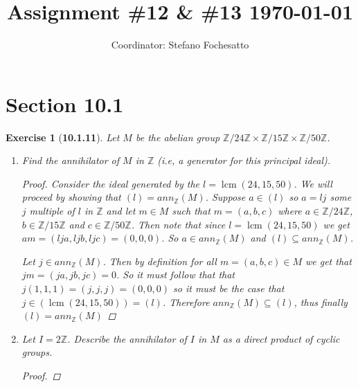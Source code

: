 \documentclass[12pt]{amsart}
\title{Assignment \#12 \& \#13 \today}
\author{Coordinator: Stefano Fochesatto}
\newtheorem{exercise}[theorem]{Exercise}
\theoremstyle{remark}
\newcommand{\ZZ}{{\mathbb Z}}
\theoremstyle{mycomment}
\DeclareMathOperator{\lcm}{lcm}
\begin{document}
\maketitle
\doublespacing %



\section*{Section 10.1}


\begin{exercise}[\textbf{10.1.11}] Let $M$ be the abelian group $\ZZ/24\ZZ \times \ZZ/15\ZZ \times \ZZ/50\ZZ$.
  \begin{enumerate}
    \item[(a)] Find the annihilator of $M$ in $\ZZ$ (i.e, a generator for this principal ideal).
    \begin{proof} Consider the ideal generated by the $l = \lcm(24, 15, 50)$. We will proceed by showing that $(l) = ann_{\ZZ}(M)$.
      Suppose $a \in (l)$ so $a = lj$ some $j$ multiple of $l$ in $\ZZ$
      and let $m \in M$ such that $m = (a, b, c)$ where $a \in \ZZ/24\ZZ$, $b \in \ZZ/15\ZZ$ and $c \in \ZZ/50\ZZ$. 
      Then note that since $l = \lcm(24, 15, 50)$ we get $am = (lja, ljb, ljc) = (0, 0, 0)$. So $a \in ann_{\ZZ}(M)$ and $(l)\subseteq ann_{\ZZ}(M)$. 
      
      Let $j \in ann_{\ZZ}(M)$. Then by definition for all $m = (a, b, c) \in M$ we get that $jm = (ja, jb, jc) = 0$. So it must follow that
      that $j(1, 1, 1) = (j, j, j) = (0, 0, 0)$ so it must be the case that $j \in (\lcm(24, 15, 50)) = (l)$. Therefore
      $ann_{\ZZ}(M) \subseteq (l)$, thus finally $(l) = ann_{\ZZ}(M)$
    \end{proof}
\vspace{.15in}

    \item[(b)] Let $I = 2\ZZ$. Describe the annihilator of $I$ in $M$ as a direct product of cyclic groups. 
   \begin{proof}

    \end{proof}
\vspace{.15in}
  \end{enumerate}

\end{exercise}
\vspace{.5in}
\end{document}
